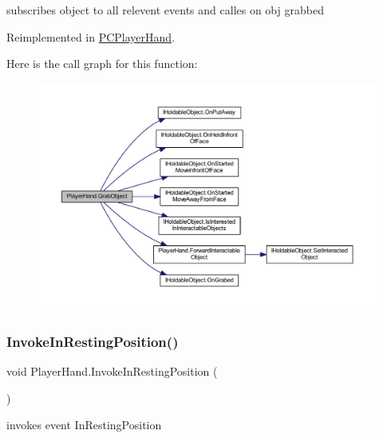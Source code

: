 subscribes object to all relevent events and calles on obj grabbed 



Reimplemented in \mbox{\hyperlink{class_p_c_player_hand_a08da28b459501727d269733569559c24}{P\+C\+Player\+Hand}}.

Here is the call graph for this function\+:
\nopagebreak
\begin{figure}[H]
\begin{center}
\leavevmode
\includegraphics[width=350pt]{class_player_hand_a64a86af904a77f4a0b92d72bd5fdf43c_cgraph}
\end{center}
\end{figure}
\mbox{\label{class_player_hand_a886f7afd66af7f0dc59696953aaed4b4}} 
\subsubsection{\texorpdfstring{Invoke\+In\+Resting\+Position()}{InvokeInRestingPosition()}}
{\footnotesize\ttfamily void Player\+Hand.\+Invoke\+In\+Resting\+Position (\begin{DoxyParamCaption}{ }\end{DoxyParamCaption})\hspace{0.3cm}{\ttfamily [protected]}}



invokes event In\+Resting\+Position 

